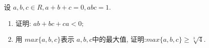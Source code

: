 \documentclass[class=ctexart,crop=false]{standalone}
\begin{document}
设 $a,b,c \in R,a+b+c=0,abc=1.$
\begin{enumerate}[label=(\arabic*)]
    \item 证明: $ab+bc+ca<0;$
    \item 用 $max\{a,b,c\}$表示 $a,b,c$中的最大值,
    证明:$max\{a,b,c\}\geqslant \sqrt[3]{4}.$
\end{enumerate}
\end{document}
